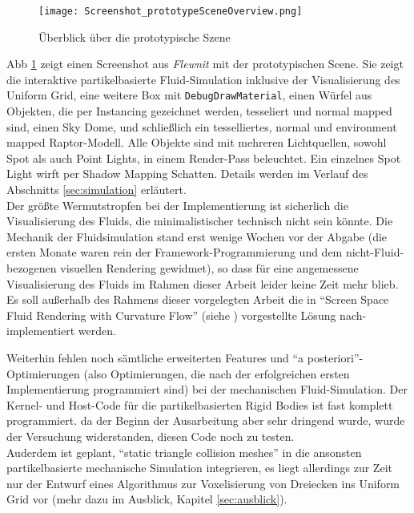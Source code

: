  	
  	\begin{figure}[!h]
		\texttt{[image: Screenshot\_prototypeSceneOverview.png]}
		\caption{Überblick über die prototypische Szene}
		\label{fig:Screenshot_prototypeSceneOverview}
	\end{figure}
	
	Abb \ref{fig:Screenshot_prototypeSceneOverview} zeigt einen Screenshot aus \emph{Flewnit} 
	mit der prototypischen Scene. Sie zeigt die interaktive partikelbasierte
	Fluid-Simulation inklusive der Visualisierung des Uniform Grid, eine weitere Box mit 
	\linebreak \lstinline|DebugDrawMaterial|,
	einen Würfel aus Objekten, die per Instancing gezeichnet werden, tesseliert und normal mapped sind,
	einen Sky Dome, und schließlich ein tesselliertes, normal und environment mapped Raptor-Modell.
	Alle Objekte sind mit mehreren Lichtquellen, sowohl Spot als auch Point Lights, in einem Render-Pass beleuchtet.
	Ein einzelnes Spot Light wirft per Shadow Mapping Schatten.  
	Details werden im Verlauf des Abschnitts \ref{sec:simulation} erläutert.\\
  	
  	Der größte Wermutstropfen bei der Implementierung ist sicherlich die Visualisierung des Fluids, die minimalistischer
  	technisch nicht sein könnte. Die Mechanik der Fluidsimulation stand erst wenige Wochen vor der 
  	Abgabe (die ersten Monate waren rein der Framework-Programmierung und dem nicht-Fluid-bezogenen
  	visuellen Rendering gewidmet), 
  	so dass für eine angemessene Visualisierung des Fluids im Rahmen dieser Arbeit leider keine Zeit mehr blieb.
  	Es soll außerhalb des Rahmens dieser vorgelegten Arbeit die in "`Screen Space Fluid Rendering with Curvature Flow"' 
  	(siehe \cite{Green2009FluidRenderingCurvatureFlow}) vorgestellte Lösung nach-implementiert werden.
  	
  	Weiterhin fehlen noch sämtliche erweiterten Features und "`a posteriori"'-Optimierungen (also Optimierungen, die 
  	nach der erfolgreichen ersten Implementierung programmiert sind) bei der mechanischen Fluid-Simulation.
  	Der Kernel- und Host-Code für die partikelbasierten Rigid Bodies ist fast komplett programmiert.
  	da der Beginn der Ausarbeitung aber sehr dringend wurde, wurde der Versuchung widerstanden,
  	diesen Code noch zu testen.\\
  	Auderdem ist geplant, "`static triangle collision meshes"' in die ansonsten partikelbasierte
  	mechanische Simulation integrieren, es liegt allerdings zur Zeit nur der Entwurf 
  	eines Algorithmus zur Voxelisierung von Dreiecken ins Uniform Grid vor
  	(mehr dazu im Ausblick, Kapitel \ref{sec:ausblick}).
  

